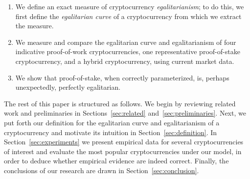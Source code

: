 \begin{enumerate}
  \item We define an exact measure of cryptocurrency
        \emph{egalitarianism}; to do this, we first define the \emph{egalitarian curve} of a
        cryptocurrency from which we extract the measure.
  \item We measure and compare the egalitarian curve and egalitarianism of
        four indicative proof-of-work cryptocurrencies, one representative
        proof-of-stake cryptocurrency, and a hybrid cryptocurrency, using
        current market data.
  \item We show that proof-of-stake, when correctly parameterized, is, perhaps unexpectedly, perfectly
        egalitarian.
\end{enumerate}

The rest of this paper is structured as follows. We begin by reviewing related
work and preliminaries in Sections~\ref{sec:related}
and~\ref{sec:preliminaries}. Next, we put forth our definition for the
egalitarian curve and egalitarianism of a cryptocurrency and motivate its
intuition in Section~\ref{sec:definition}. In Section~\ref{sec:experiments} we
present empirical data for several cryptocurrencies of interest and evaluate
the most popular cryptocurrencies under our model, in order to deduce whether
empirical evidence are indeed correct. Finally, the conclusions of our research
are drawn in Section~\ref{sec:conclusion}.
